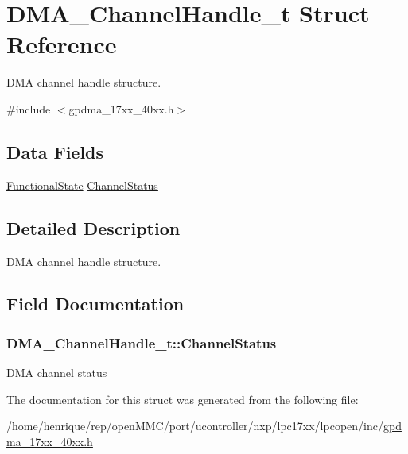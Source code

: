 \hypertarget{structDMA__ChannelHandle__t}{\section{D\-M\-A\-\_\-\-Channel\-Handle\-\_\-t Struct Reference}
\label{structDMA__ChannelHandle__t}
}


D\-M\-A channel handle structure.  




{\ttfamily \#include $<$gpdma\-\_\-17xx\-\_\-40xx.\-h$>$}

\subsection*{Data Fields}
\begin{DoxyCompactItemize}
\item 
\hyperlink{group__LPC__Types__Public__Types_gac9a7e9a35d2513ec15c3b537aaa4fba1}{Functional\-State} \hyperlink{structDMA__ChannelHandle__t_ae776f1fa849f377ff64ffe9b8522105f}{Channel\-Status}
\end{DoxyCompactItemize}


\subsection{Detailed Description}
D\-M\-A channel handle structure. 

\subsection{Field Documentation}
\hypertarget{structDMA__ChannelHandle__t_ae776f1fa849f377ff64ffe9b8522105f}{
\subsubsection[{Channel\-Status}]{ D\-M\-A\-\_\-\-Channel\-Handle\-\_\-t\-::\-Channel\-Status}}\label{structDMA__ChannelHandle__t_ae776f1fa849f377ff64ffe9b8522105f}
D\-M\-A channel status 

The documentation for this struct was generated from the following file\-:\begin{DoxyCompactItemize}
\item 
/home/henrique/rep/open\-M\-M\-C/port/ucontroller/nxp/lpc17xx/lpcopen/inc/\hyperlink{gpdma__17xx__40xx_8h}{gpdma\-\_\-17xx\-\_\-40xx.\-h}\end{DoxyCompactItemize}
